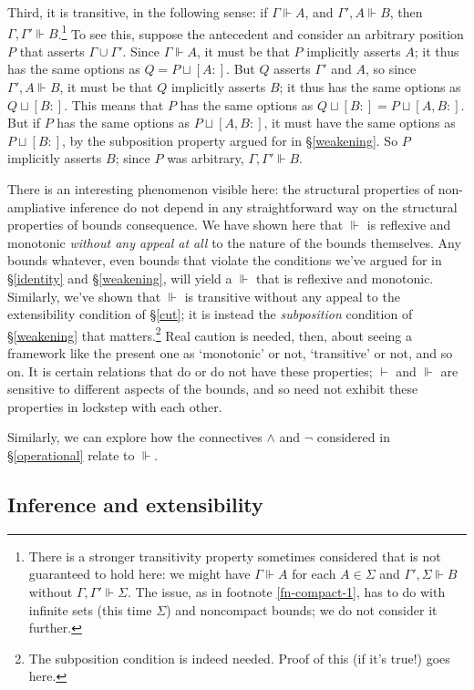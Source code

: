 \documentclass{article}
\newcommand{\G}{\ensuremath{\Gamma}}
\newcommand{\Sig}{\ensuremath{\Sigma}}
\newcommand{\pcup}{\ensuremath{\sqcup}}
\newcommand{\pos}[2]{\ensuremath{[#1:#2]}}
\newcommand{\cns}{\vdash}
\newcommand{\ded}{\Vdash}
\begin{document}
Third, it is transitive, in the following sense: if $\G \ded A$, and $\G', A \ded B$, then $\G, \G' \ded B$.\footnote{\label{fn-compact-2}There is a stronger transitivity property sometimes considered that is not guaranteed to hold here: we might have $\G \ded A$ for each $A \in \Sig$ and $\G', \Sig \ded B$ without $\G, \G' \ded \Sig$.
The issue, as in footnote \ref{fn-compact-1}, has to do with infinite sets (this time $\Sig$) and noncompact bounds; we do not consider it further.
}
To see this, suppose the antecedent and consider an arbitrary position $P$ that asserts $\G \cup \G'$.
Since $\G \ded A$, it must be that $P$ implicitly asserts $A$; it thus has the same options as $Q = P \pcup \pos{A}{}$. 
But $Q$ asserts $\G'$ and $A$, so since $\G', A \ded B$, it must be that $Q$ implicitly asserts $B$; it thus has the same options as $Q \pcup \pos{B}{}$.
This means that $P$ has the same options as $Q \pcup \pos{B}{} = P \pcup \pos{A, B}{}$.
But if $P$ has the same options as $P \pcup \pos{A, B}{}$, it must have the same options as $P \pcup \pos{B}{}$, by the subposition property argued for in \S\ref{weakening}.
So $P$ implicitly asserts $B$; since $P$ was arbitrary, $\G, \G' \ded B$.

There is an interesting phenomenon visible here: the structural properties of non-ampliative inference do not depend in any straightforward way on the structural properties of bounds consequence.
We have shown here that $\ded$ is reflexive and monotonic {\em without any appeal at all} to the nature of the bounds themselves.
Any bounds whatever, even bounds that violate the conditions we've argued for in \S\ref{identity} and \S\ref{weakening}, will yield a $\ded$ that is reflexive and monotonic.
Similarly, we've shown that $\ded$ is transitive without any appeal to the extensibility condition of \S\ref{cut}; it is instead the {\em subposition} condition of \S\ref{weakening} that matters.\footnote{The subposition condition is indeed needed. Proof of this (if it's true!) goes here.}
Real caution is needed, then, about seeing a framework like the present one as `monotonic' or not, `transitive' or not, and so on. 
It is certain relations that do or do not have these properties; $\cns$ and $\ded$ are sensitive to different aspects of the bounds, and so need not exhibit these properties in lockstep with each other.

Similarly, we can explore how the connectives $\wedge$ and $\neg$ considered in \S\ref{operational} relate to $\ded$.


\subsection{Inference and extensibility}
\end{document}
